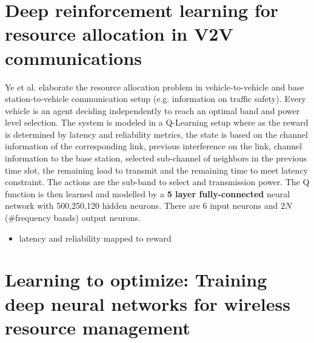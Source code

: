 \section{Deep reinforcement learning for resource allocation in V2V communications\cite{Ye2017}}
Ye et al. elaborate the resource allocation problem in vehicle-to-vehicle and base station-to-vehicle communication setup (e.g. information on traffic safety). Every vehicle is an agent deciding independently to reach an optimal band and power level selection. The system is modeled in a Q-Learning setup where as the reward is determined by latency and reliability metrics, the state is based on the channel information of the corresponding link, previous interference on the link, channel information to the base station, selected sub-channel of neighbors in the previous time slot, the remaining load to transmit and the remaining time to meet latency constraint. The actions are the sub-band to select and transmission power. The Q function is then learned and modelled by a \textbf{5 layer fully-connected} neural network with 500,250,120 hidden neurons. There are 6 input neurons and $2N$ (\#frequency bands) output neurons.

\ifdefined\SHOWNOTES
\begin{itemize}
    \item latency and reliability mapped to reward
\end{itemize}
\fi


\section{Learning to optimize: Training deep neural networks for wireless resource management \cite{Sun2017}}

